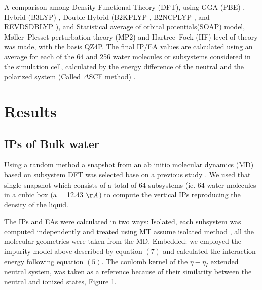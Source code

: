 \documentclass[12pt,a4paper]{article}
\begin{document}
A comparison among Density Functional Theory (DFT), using GGA (PBE) \cite{perdew1996phys}, Hybrid (B3LYP) \cite{hertwig1997parameterization},
Double-Hybrid (B2KPLYP \cite{yu2013intermolecular}, B2NCPLYP \cite{yu2014double}, and REVDSDBLYP \cite{kozuch2010dsd}),
and Statistical average of orbital potentials(SOAP) model\cite{schipper2000molecular, gritsenko1999approximation}, 
Møller–Plesset perturbation theory (MP2) \cite{head1988mp2} and Hartree–Fock (HF) \cite{marshall1961unrestricted} level of theory was made, with the basis QZ4P.
The final IP/EA values are calculated using an average for each of the 64 and 256 water molecules or subsystems considered in the simulation cell,
calculated by the energy difference of the neutral and the polarized system (Called $\Delta$SCF method) \cite{bagus1965self,waskom2017mwaskom}.

\section{Results}
\subsection{IPs of Bulk water}

Using a random method a snapshot from an ab initio molecular dynamics (MD) based on subsystem DFT was selected base on a
previous study \cite{genova2016avoiding}. We used that single snapshot which consists of a total of 64 subsystems
(ie. 64 water molecules in a cubic box (a = 12.43 $\AA$) to compute the vertical IPs reproducing the density of the liquid.

The IPs and EAs were calculated in two ways: Isolated, each subsystem was computed independently and treated using MT
assume isolated method \cite{martyna1999reciprocal}, all the molecular geometries were taken from the MD. Embedded: 
we employed the impurity model above described by equation $(7)$ and calculated the interaction energy following 
equation $(5)$. The coulomb kernel of the $\eta -\eta_{I}$ extended neutral system, was taken as a reference because of
their similarity between the neutral and ionized states, Figure 1.
\end{document}
